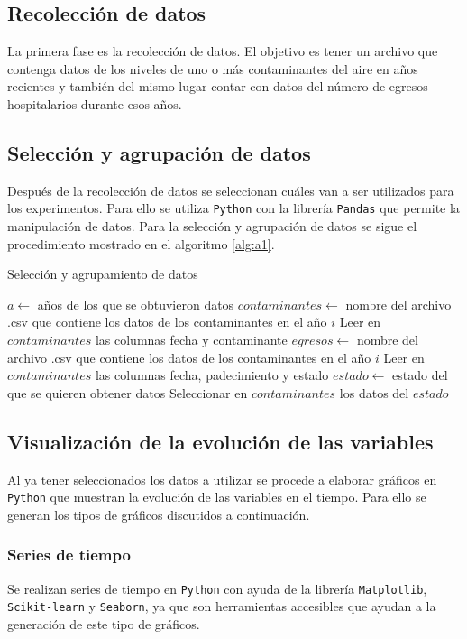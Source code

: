 \subsection{Recolección de datos}
La primera fase es la recolección de datos. El objetivo es tener un archivo que contenga datos de los niveles de uno o más contaminantes del aire en años recientes y también del mismo lugar contar con datos del número de egresos hospitalarios durante esos años.

\subsection{Selección y agrupación de datos}
Después de la recolección de datos se seleccionan cuáles van a ser utilizados para los experimentos. Para ello se utiliza \texttt{Python} con la librería \texttt{Pandas} que permite la manipulación de datos. 
Para la selección y agrupación de datos se sigue el procedimiento mostrado en el algoritmo \ref{alg:a1}.

\begin{algorithm}
\caption{Selección y agrupamiento de datos}\label{alg:a1}
\begin{algorithmic}[1]
\State $a \leftarrow $ años de los que se obtuvieron datos
    \State $contaminantes \leftarrow $ nombre del archivo .csv que contiene los datos de los contaminantes en el año $i$
    \State Leer en $contaminantes$ las columnas fecha y contaminante 
    \State $egresos \leftarrow $ nombre del archivo .csv que contiene los datos de los contaminantes en el año $i$
    \State Leer en $contaminantes$ las columnas fecha, padecimiento y estado
    \State $estado \leftarrow $ estado del que se quieren obtener datos
    \State Seleccionar en $contaminantes$ los datos del $estado$
\EndFor
\end{algorithmic} 
\end{algorithm}

\subsection{Visualización de la evolución de las variables}
Al ya tener seleccionados los datos a utilizar se procede a elaborar gráficos en \texttt{Python} que muestran la evolución de las variables en el tiempo. Para ello se generan los tipos de gráficos discutidos a continuación.

\subsubsection{Series de tiempo}
Se realizan series de tiempo en \texttt{Python} con ayuda de la librería  \texttt{Matplotlib}, \texttt{Scikit-learn} y \texttt{Seaborn}, ya que son herramientas accesibles que ayudan a la generación de este tipo de gráficos. %

